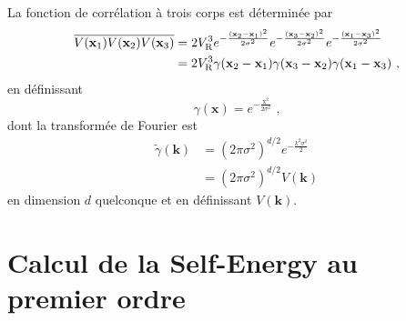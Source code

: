 La fonction de corrélation à trois corps est déterminée par
\begin{align}
\overline{V(\mathbf{x}_{\mathrm{1}})V(\mathbf{x}_{\mathrm{2}})V(\mathbf{x}_{\mathrm{3}})}&= 2V_{\mathrm{R}}^3 e^{-\frac{(\mathbf{x}_{\mathrm{2}}-\mathbf{x}_{\mathrm{1}})^2}{2\sigma^2}}e^{-\frac{(\mathbf{x}_{\mathrm{3}}-\mathbf{x}_{\mathrm{2}})^2}{2\sigma^2}}e^{-\frac{(\mathbf{x}_{\mathrm{1}}-\mathbf{x}_{\mathrm{3}})^2}{2\sigma^2}} \\ 
&=2V_{\mathrm{R}}^3 \gamma(\mathbf{x}_{\mathrm{2}}-\mathbf{x}_{\mathrm{1}})\gamma(\mathbf{x}_{\mathrm{3}}-\mathbf{x}_{\mathrm{2}})\gamma(\mathbf{x}_{\mathrm{1}}-\mathbf{x}_{\mathrm{3}}) \text{ ,}
\end{align}
en définissant 
\begin{equation}
\gamma(\mathbf{x})=e^{-\frac{\mathrm{x}^2}{2\sigma^2}} \text{ ,}
\end{equation}
dont la transformée de Fourier est
\begin{align}
\tilde{\gamma}(\mathbf{k}) &= (2\pi \sigma^2)^{d/2} e^{-\frac{k^2\sigma^2}{2}} \\
&= (2\pi \sigma^2)^{d/2} V(\mathbf{k})
\end{align}
en dimension $d$ quelconque et en définissant $V(\mathbf{k})$.

\section{Calcul de la Self-Energy au premier ordre}

